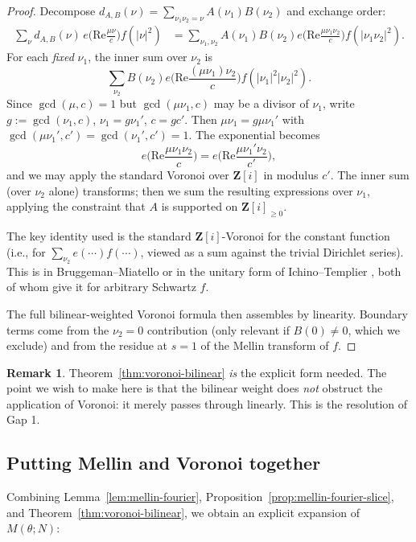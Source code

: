 \documentclass[11pt]{article}
\theoremstyle{definition}
\newtheorem{remark}[theorem]{Remark}
\newcommand{\Z}{\mathbf{Z}}
\newcommand{\Zi}{\Z[i]}
\renewcommand{\Re}{\mathrm{Re}}
\begin{document}
\begin{proof}
Decompose $d_{A,B}(\nu)=\sum_{\nu_1\nu_2=\nu}A(\nu_1)B(\nu_2)$ and exchange order:
\begin{align*}
\sum_\nu d_{A,B}(\nu)\,e\Big(\Re\frac{\mu\nu}{c}\Big)f(|\nu|^2)&=\sum_{\nu_1,\nu_2}A(\nu_1)B(\nu_2)e\Big(\Re\frac{\mu\nu_1\nu_2}{c}\Big)f(|\nu_1\nu_2|^2).
\end{align*}
For each \emph{fixed} $\nu_1$, the inner sum over $\nu_2$ is
\[
\sum_{\nu_2}B(\nu_2)e\Big(\Re\frac{(\mu\nu_1)\nu_2}{c}\Big)f(|\nu_1|^2|\nu_2|^2).
\]
Since $\gcd(\mu,c)=1$ but $\gcd(\mu\nu_1,c)$ may be a divisor of $\nu_1$, write $g:=\gcd(\nu_1,c)$, $\nu_1=g\nu_1'$, $c=gc'$. Then $\mu\nu_1=g\mu\nu_1'$ with $\gcd(\mu\nu_1',c')=\gcd(\nu_1',c')=1$. The exponential becomes
\[
e\Big(\Re\frac{\mu\nu_1\nu_2}{c}\Big)=e\Big(\Re\frac{\mu\nu_1'\nu_2}{c'}\Big),
\]
and we may apply the standard Voronoi over $\Zi$ in modulus $c'$. The inner sum (over $\nu_2$ alone) transforms; then we sum the resulting expressions over $\nu_1$, applying the constraint that $A$ is supported on $\Zi_{\ge 0}$.

The key identity used is the standard $\Zi$-Voronoi for the constant function (i.e., for $\sum_{\nu_2}e(\cdots)f(\cdots)$, viewed as a sum against the trivial Dirichlet series). This is in Bruggeman--Miatello \cite{BMiat} or in the unitary form of Ichino--Templier \cite{ichino-templier}, both of whom give it for arbitrary Schwartz $f$.

The full bilinear-weighted Voronoi formula then assembles by linearity. Boundary terms come from the $\nu_2=0$ contribution (only relevant if $B(0)\ne 0$, which we exclude) and from the residue at $s=1$ of the Mellin transform of $f$.
\end{proof}

\begin{remark}
Theorem~\ref{thm:voronoi-bilinear} \emph{is} the explicit form needed. The point we wish to make here is that the bilinear weight does \emph{not} obstruct the application of Voronoi: it merely passes through linearly. This is the resolution of Gap 1.
\end{remark}

\subsection{Putting Mellin and Voronoi together}

Combining Lemma~\ref{lem:mellin-fourier}, Proposition~\ref{prop:mellin-fourier-slice}, and Theorem~\ref{thm:voronoi-bilinear}, we obtain an explicit expansion of $M(\theta;N)$:
\end{document}
